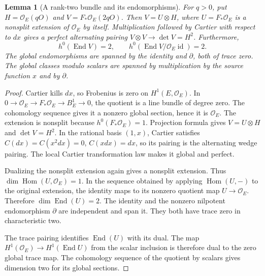 \documentclass[11pt]{article}
\newtheorem{lemma}[theorem]{Lemma}
\theoremstyle{definition}\newtheorem{definition}[theorem]{Definition}
\theoremstyle{remark}\newtheorem{remark}[theorem]{Remark}
\newcommand{\OO}{\mathcal O}
\newcommand{\End}{\operatorname{End}}
\newcommand{\Hom}{\operatorname{Hom}}
\begin{document}
\begin{lemma}[A rank-two bundle and its endomorphisms]\label{lem:ss-end}
For $q>0$, put $H=\OO_E(qO)$ and $V=F_*\OO_E(2qO)$. Then $V=U\otimes H$, where $U=F_*\OO_E$ is a nonsplit extension of $\OO_E$ by itself. Multiplication followed by Cartier with respect to $dx$ gives a perfect alternating pairing $V\otimes V\to\det V=H^2$. Furthermore,
\[
 h^0(\End V)=2,\qquad h^0(\End V/\OO_E\operatorname{id})=2.
\]
The global endomorphisms are spanned by the identity and $\partial$, both of trace zero. The global classes modulo scalars are spanned by multiplication by the source function $x$ and by $\partial$.
\end{lemma}
\begin{proof}
Cartier kills $dx$, so Frobenius is zero on $H^1(E,\OO_E)$. In
$0\to\OO_E\to F_*\OO_E\to B^1_E\to0$, the quotient is a line bundle of degree zero. The cohomology sequence gives it a nonzero global section, hence it is $\OO_E$. The extension is nonsplit because $h^0(F_*\OO_E)=1$. Projection formula gives $V=U\otimes H$ and $\det V=H^2$. In the rational basis $(1,x)$, Cartier satisfies $C(dx)=C(x^2dx)=0$, $C(xdx)=dx$, so its pairing is the alternating wedge pairing. The local Cartier transformation law makes it global and perfect.

Dualizing the nonsplit extension again gives a nonsplit extension. Thus $\dim\Hom(U,\OO_E)=1$. In the sequence obtained by applying $\Hom(U,-)$ to the original extension, the identity maps to its nonzero quotient map $U\to\OO_E$. Therefore $\dim\End(U)=2$. The identity and the nonzero nilpotent endomorphism $\partial$ are independent and span it. They both have trace zero in characteristic two.

The trace pairing identifies $\End(U)$ with its dual. The map $H^1(\OO_E)\to H^1(\End U)$ from the scalar inclusion is therefore dual to the zero global trace map. The cohomology sequence of the quotient by scalars gives dimension two for its global sections.


\end{proof}
\end{document}
